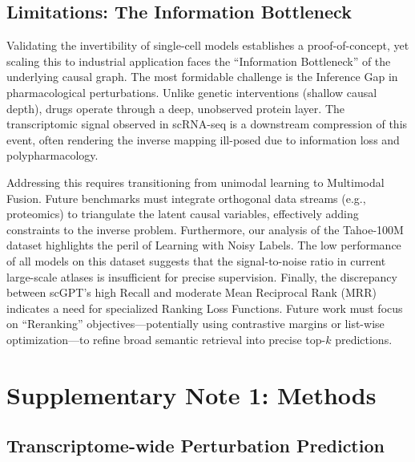 \documentclass[conference]{IEEEtran}
\begin{document}
\subsection{Limitations: The Information Bottleneck}
Validating the invertibility of single-cell models establishes a proof-of-concept, yet scaling this to industrial application faces the ``Information Bottleneck'' of the underlying causal graph. The most formidable challenge is the Inference Gap in pharmacological perturbations. Unlike genetic interventions (shallow causal depth), drugs operate through a deep, unobserved protein layer. The transcriptomic signal observed in scRNA-seq is a downstream compression of this event, often rendering the inverse mapping ill-posed due to information loss and polypharmacology.

Addressing this requires transitioning from unimodal learning to Multimodal Fusion. Future benchmarks must integrate orthogonal data streams (e.g., proteomics) to triangulate the latent causal variables, effectively adding constraints to the inverse problem. Furthermore, our analysis of the Tahoe-100M dataset highlights the peril of Learning with Noisy Labels. The low performance of all models on this dataset suggests that the signal-to-noise ratio in current large-scale atlases is insufficient for precise supervision. Finally, the discrepancy between scGPT's high Recall and moderate Mean Reciprocal Rank (MRR) indicates a need for specialized Ranking Loss Functions. Future work must focus on ``Reranking'' objectives—potentially using contrastive margins or list-wise optimization—to refine broad semantic retrieval into precise top-$k$ predictions.

\newpage


\clearpage
\appendix
\renewcommand{\thesection}{Appendix \Alph{section}}

\section{Supplementary Note 1: Methods}

\subsection{Transcriptome-wide Perturbation Prediction}
\end{document}
